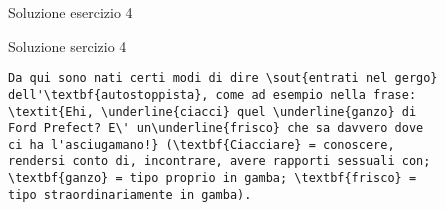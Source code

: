 \begin{frame}[fragile]{Soluzione esercizio 4}

\begin{soluzione}{Soluzione sercizio 4}
\begin{code}
\begin{verbatim}
Da qui sono nati certi modi di dire \sout{entrati nel gergo} 
dell'\textbf{autostoppista}, come ad esempio nella frase: 
\textit{Ehi, \underline{ciacci} quel \underline{ganzo} di 
Ford Prefect? E\' un\underline{frisco} che sa davvero dove 
ci ha l'asciugamano!} (\textbf{Ciacciare} = conoscere, 
rendersi conto di, incontrare, avere rapporti sessuali con; 
\textbf{ganzo} = tipo proprio in gamba; \textbf{frisco} = 
tipo straordinariamente in gamba).
\end{verbatim}
\end{code}
\end{soluzione}

\end{frame}